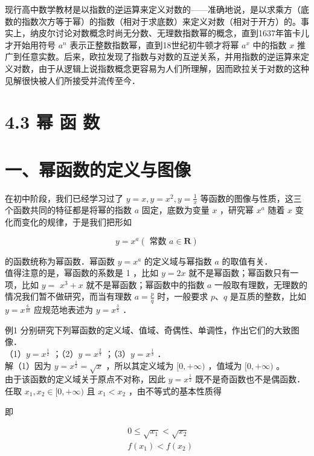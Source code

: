 \documentclass[10pt]{article}
\begin{document}
现行高中数学教材是以指数的逆运算来定义对数的——准确地说，是以求乘方（底数的指数次方等于幂）的指数（相对于求底数）来定义对数（相对于开方）的。事实上，纳皮尔讨论对数概念时尚无分数、无理数指数幂的概念，直到1637年笛卡儿才开始用符号 \(a^{n}\) 表示正整数指数幂，直到18世纪初牛顿才将幂 \(a^{x}\) 中的指数 \(x\) 推广到任意实数。后来，欧拉发现了指数与对数的互逆关系，并用指数的逆运算来定义对数，由于从逻辑上说指数概念更容易为人们所理解，因而欧拉关于对数的这种见解很快被人们所接受并流传至今．

\section*{4.3 幂 函 数}
\section*{一、幂函数的定义与图像}
在初中阶段，我们已经学习过了 \(y=x, y=x^{2}, y=\frac{1}{x}\) 等函数的图像与性质，这三个函数共同的特征都是将幂的指数 \(a\) 固定，底数为变量 \(x\) ，研究幂 \(x^{a}\) 随着 \(x\) 变化而变化的规律，于是我们把形如

\[
y=x^{a}(\text { 常数 } a \in \mathbf{R})
\]

的函数统称为幂函数．幂函数 \(y=x^{a}\) 的定义域与幂指数 \(a\) 的取值有关．\\
值得注意的是，幂函数的系数是 1 ，比如 \(y=2 x\) 就不是幂函数；幂函数只有一项，比如 \(y=\) \(x^{3}+x\) 就不是幂函数；幂函数中的指数 \(a\) 一般取有理数，无理数的情况我们暂不做研究，而当有理数 \(a=\frac{p}{q}\) 时，一般要求 \(p 、 q\) 是互质的整数，比如 \(y=x^{\frac{6}{10}}\) 应规范地表述为 \(y=x^{\frac{3}{5}}\) ．

例1 分别研究下列幂函数的定义域、值域、奇偶性、单调性，作出它们的大致图像．\\
（1）\(y=x^{\frac{1}{2}}\) ；（2）\(y=x^{\frac{2}{3}}\) ；（3）\(y=x^{\frac{1}{3}}\) ．\\
解（1）因为 \(y=x^{\frac{1}{2}}=\sqrt{x}\) ，所以其定义域为 \([0,+\infty)\) ，值域为 \([0,+\infty)\) 。\\
由于该函数的定义域关于原点不对称，因此 \(y=x^{\frac{1}{2}}\) 既不是奇函数也不是偶函数．\\
任取 \(x_{1}, x_{2} \in[0,+\infty)\) 且 \(x_{1}<x_{2}\) ，由不等式的基本性质得

即

\[
\begin{aligned}
& 0 \leqslant \sqrt{x_{1}}<\sqrt{x_{2}} \\
& f\left(x_{1}\right)<f\left(x_{2}\right)
\end{aligned}
\]
\end{document}

